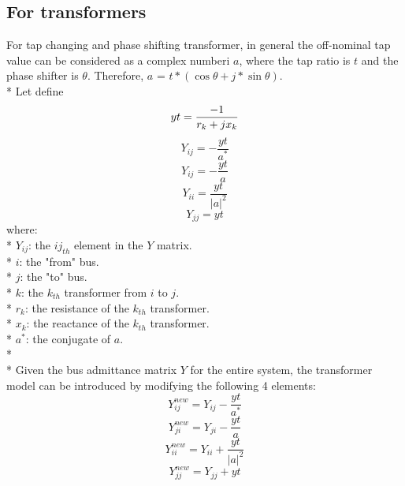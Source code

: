 \documentclass[12pt]{article}
\begin{document}
\subsection*{For transformers}
For tap changing and phase shifting transformer, in general the off-nominal tap value can be considered as a complex numberi $a$, where the tap ratio is $t$ and the phase shifter is $\theta$.  Therefore, $a$ = $t*(\cos{\theta}+j*\sin{\theta})$. \\*
Let define
\begin{equation}
yt = \frac{-1}{r_{k}+j\*x_{k}}
\end{equation} 
\begin{equation}
Y_{ij} = -\frac{yt}{a^{*}}
\end{equation} 
\begin{equation}
Y_{ij} = -\frac{yt}{a}
\end{equation} 
\begin{equation}
Y_{ii} = \frac{yt}{{|a|}^2}
\end{equation} 
\begin{equation}
Y_{jj} = yt 
\end{equation} 
where:\\*
$Y_{ij}$: the ${ij}_{th}$ element in the $Y$ matrix.\\* 
$i$: the "from" bus.\\*
$j$: the "to" bus. \\*
$k$: the $k_{th}$ transformer from $i$ to $j$. \\*
$r_{k}$: the resistance of the $k_{th}$ transformer.\\*
$x_{k}$: the reactance of the $k_{th}$ transformer.\\*
$a^*$: the conjugate of $a$.\\*
\\*
Given the bus admittance matrix $Y$ for the entire system, the transformer model can be introduced by modifying the following 4 elements:
\begin{equation}
Y_{ij}^{new} = Y_{ij} - \frac{yt}{a^{*}}
\end{equation} 
\begin{equation}
Y_{ji}^{new} = Y_{ji} - \frac{yt}{a}
\end{equation} 
\begin{equation}
Y_{ii}^{new} = Y_{ii} + \frac{yt}{{|a|}^2}
\end{equation} 
\begin{equation}
Y_{jj}^{new} = Y_{jj} + yt
\end{equation} 
\end{document}
